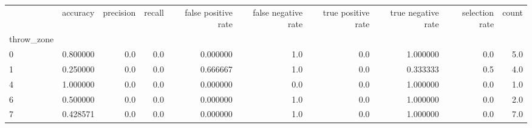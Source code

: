 \begin{tabular}{lrrrrrrrrr}
\toprule
{} &  accuracy &  precision &  recall &  false positive rate &  false negative rate &  true positive rate &  true negative rate &  selection rate &  count \\
throw\_zone &           &            &         &                      &                      &                     &                     &                 &        \\
\midrule
0          &  0.800000 &        0.0 &     0.0 &             0.000000 &                  1.0 &                 0.0 &            1.000000 &             0.0 &    5.0 \\
1          &  0.250000 &        0.0 &     0.0 &             0.666667 &                  1.0 &                 0.0 &            0.333333 &             0.5 &    4.0 \\
4          &  1.000000 &        0.0 &     0.0 &             0.000000 &                  0.0 &                 0.0 &            1.000000 &             0.0 &    1.0 \\
6          &  0.500000 &        0.0 &     0.0 &             0.000000 &                  1.0 &                 0.0 &            1.000000 &             0.0 &    2.0 \\
7          &  0.428571 &        0.0 &     0.0 &             0.000000 &                  1.0 &                 0.0 &            1.000000 &             0.0 &    7.0 \\
\bottomrule
\end{tabular}
